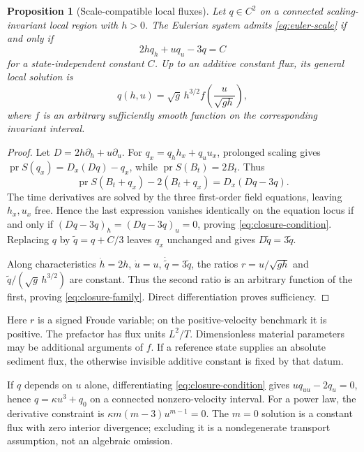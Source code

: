 \documentclass[11pt,a4paper,oneside]{report}
\numberwithin{equation}{chapter}
\newtheorem{proposition}[theorem]{Proposition}
\newcommand{\pr}{\operatorname{pr}}
\begin{document}
\begin{proposition}[Scale-compatible local fluxes]\label{prop:closure}
Let $q\in C^2$ on a connected scaling-invariant local region with $h>0$. The Eulerian system admits \eqref{eq:euler-scale} if and only if
\begin{equation}\label{eq:closure-condition}
2h q_h+u q_u-3q=C
\end{equation}
for a state-independent constant $C$. Up to an additive constant flux, its general local solution is
\begin{equation}\label{eq:closure-family}
q(h,u)=\sqrt g\,h^{3/2} f\!\left(\frac{u}{\sqrt{gh}}\right),
\end{equation}
where $f$ is an arbitrary sufficiently smooth function on the corresponding invariant interval.
\end{proposition}
\begin{proof}
Let $D=2h\partial_h+u\partial_u$. For $q_x=q_hh_x+q_uu_x$, prolonged scaling gives $\pr S(q_x)=D_x(Dq)-q_x$, while $\pr S(B_t)=2B_t$. Thus
\begin{equation}
\pr S(B_t+q_x)-2(B_t+q_x)=D_x(Dq-3q).
\end{equation}
The time derivatives are solved by the three first-order field equations, leaving $h_x,u_x$ free. Hence the last expression vanishes identically on the equation locus if and only if $(Dq-3q)_h=(Dq-3q)_u=0$, proving \eqref{eq:closure-condition}. Replacing $q$ by $\widetilde q=q+C/3$ leaves $q_x$ unchanged and gives $D\widetilde q=3\widetilde q$.

Along characteristics $\dot h=2h$, $\dot u=u$, $\dot{\widetilde q}=3\widetilde q$, the ratios $r=u/\sqrt{gh}$ and $\widetilde q/(\sqrt g\,h^{3/2})$ are constant. Thus the second ratio is an arbitrary function of the first, proving \eqref{eq:closure-family}. Direct differentiation proves sufficiency.\end{proof}
Here $r$ is a signed Froude variable; on the positive-velocity benchmark it is positive. The prefactor has flux units $L^2/T$. Dimensionless material parameters may be additional arguments of $f$. If a reference state supplies an absolute sediment flux, the otherwise invisible additive constant is fixed by that datum.

If $q$ depends on $u$ alone, differentiating \eqref{eq:closure-condition} gives $uq_{uu}-2q_u=0$, hence $q=\kappa u^3+q_0$ on a connected nonzero-velocity interval. For a power law, the derivative constraint is $\kappa m(m-3)u^{m-1}=0$. The $m=0$ solution is a constant flux with zero interior divergence; excluding it is a nondegenerate transport assumption, not an algebraic omission.
\end{document}

